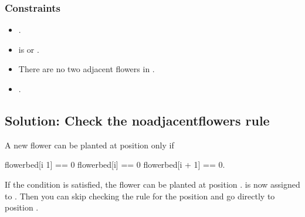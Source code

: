 \documentclass[letterpaper,12pt,english]{book}
\begin{document}
\subsubsection{Constraints}
\label{\detokenize{Array/01_ARR_605_Can_Place_Flowers:constraints}}\begin{itemize}
\item {} 
\sphinxAtStartPar
{}.

\item {} 
\sphinxAtStartPar
{} is  or .

\item {} 
\sphinxAtStartPar
There are no two adjacent flowers in .

\item {} 
\sphinxAtStartPar
{}.

\end{itemize}


\subsection{Solution: Check the no\sphinxhyphen{}adjacent\sphinxhyphen{}flowers rule}
\label{\detokenize{Array/01_ARR_605_Can_Place_Flowers:solution-check-the-no-adjacent-flowers-rule}}
\sphinxAtStartPar
A new flower can be planted at position  only if

\begin{sphinxVerbatim}[commandchars=\\\{\}]
flowerbed[i \PYGZhy{} 1] == 0 \PYGZam{}\PYGZam{} flowerbed[i] == 0 \PYGZam{}\PYGZam{} flowerbed[i + 1] == 0.
\end{sphinxVerbatim}

\sphinxAtStartPar
If the condition is satisfied, the flower can be planted at position .  is now assigned to . Then you can skip checking the rule for the position  and go directly to position .
\end{document}
